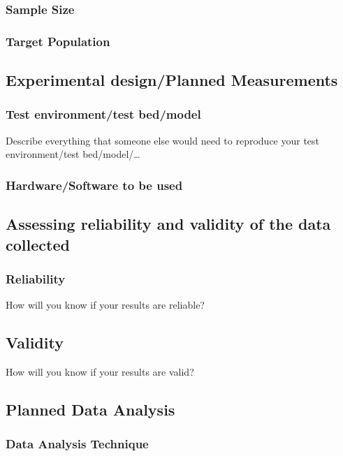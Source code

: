 \documentclass[a4paper,12pt,twocolumn]{article}
\numberwithin{figure}{section}
\numberwithin{table}{section}
\begin{document}
\subsubsection{Sample Size}

\subsubsection{Target Population}


\subsection{Experimental design/Planned Measurements}


\subsubsection{Test environment/test bed/model}
Describe everything that someone else would need to reproduce your test environment/test
bed/model/…

\subsubsection{Hardware/Software to be used}


\subsection{Assessing reliability and validity of the data collected}

\subsubsection{Reliability}
How will you know if your results are reliable?

\subsection{Validity}
How will you know if your results are valid?



\subsection{Planned Data Analysis}

\subsubsection{Data Analysis Technique}
\end{document}
